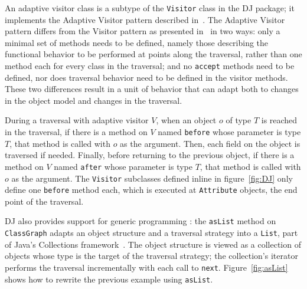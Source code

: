 \documentclass{llncs}
\newcommand{\code}[1]{\texttt{#1}}
\begin{document}
An adaptive visitor class is a subtype of the \code{Visitor} class in
the DJ package; it implements the Adaptive Visitor pattern described
in~\cite[pp.~426-427]{karl:demeter}.  The Adaptive Visitor pattern
differs from the Visitor pattern as presented in~\cite{gang-of-4}
in two ways: only a minimal set of methods needs to be defined, namely
those describing the functional behavior to be performed at points
along the traversal, rather than one method each for every class in
the traversal; and no \code{accept} methods need to be defined, nor
does traversal behavior need to be defined in the visitor methods.
These two differences result in a unit of behavior that can adapt both
to changes in the object model and changes in the traversal.

During a traversal with adaptive visitor $V$, when an object $o$ of type $T$ is
reached in the traversal, if there is a method on $V$ named
\code{before} whose parameter is type $T$, that method is called with
$o$ as the argument.  Then, each field on the object is traversed if
needed.  Finally, before returning to the previous object, if there is
a method on $V$ named \code{after} whose parameter is type $T$, that
method is called with $o$ as the argument.  The \code{Visitor}
subclasses defined inline in figure~\ref{fig:DJ} only define one
\code{before} method each, which is executed at \code{Attribute}
objects, the end point of the traversal.

DJ also provides support for generic programming
\cite{musser-stepanov:GL}: the \code{asList} method on
\code{ClassGraph} adapts an object structure and a traversal strategy
into a \code{List}, part of Java's Collections
framework~\cite{Collections}.  The object structure is viewed as a
collection of objects whose type is the target of the traversal
strategy; the collection's iterator performs the traversal
incrementally with each call to \code{next}.  Figure~\ref{fig:asList}
shows how to rewrite the previous example using \code{asList}.
\end{document}
